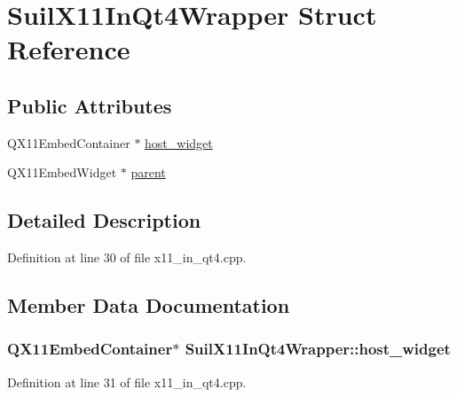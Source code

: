 \hypertarget{struct_suil_x11_in_qt4_wrapper}{}\section{Suil\+X11\+In\+Qt4\+Wrapper Struct Reference}
\label{struct_suil_x11_in_qt4_wrapper}
\subsection*{Public Attributes}
\begin{DoxyCompactItemize}
\item 
Q\+X11\+Embed\+Container $\ast$ \hyperlink{struct_suil_x11_in_qt4_wrapper_a4d4f7e7da40941581e384363875224c3}{host\+\_\+widget}
\item 
Q\+X11\+Embed\+Widget $\ast$ \hyperlink{struct_suil_x11_in_qt4_wrapper_a1bc52a3b721b93e1a95bc53bc7c461ad}{parent}
\end{DoxyCompactItemize}


\subsection{Detailed Description}


Definition at line 30 of file x11\+\_\+in\+\_\+qt4.\+cpp.



\subsection{Member Data Documentation}
\subsubsection[{\texorpdfstring{host\+\_\+widget}{host_widget}}]{\setlength{\rightskip}{0pt plus 5cm}Q\+X11\+Embed\+Container$\ast$ Suil\+X11\+In\+Qt4\+Wrapper\+::host\+\_\+widget}\hypertarget{struct_suil_x11_in_qt4_wrapper_a4d4f7e7da40941581e384363875224c3}{}\label{struct_suil_x11_in_qt4_wrapper_a4d4f7e7da40941581e384363875224c3}


Definition at line 31 of file x11\+\_\+in\+\_\+qt4.\+cpp.

